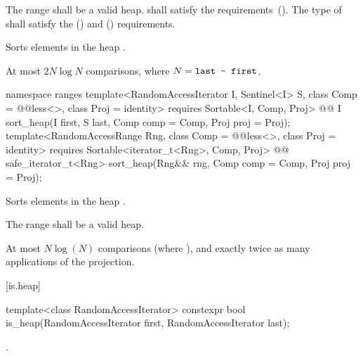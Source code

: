 \begin{itemdescr}
\pnum
\requires The range  shall be a valid heap.
 shall satisfy the
 requirements~(). The type
of  shall satisfy the
 () and
 () requirements.

\pnum
\effects
Sorts elements in the heap
.

\pnum
\complexity
At most $2N \log N$
comparisons, where
$N = \texttt{last - first}$.
\end{itemdescr}

\begin{addedblock}
%
\begin{itemdecl}
namespace ranges {
  template<RandomAccessIterator I, Sentinel<I> S, class Comp = @@less<>,
      class Proj = identity>
    requires Sortable<I, Comp, Proj>
    @@ I
      sort_heap(I first, S last, Comp comp = Comp{}, Proj proj = Proj{});
  template<RandomAccessRange Rng, class Comp = @@less<>, class Proj = identity>
    requires Sortable<iterator_t<Rng>, Comp, Proj>
    @@ safe_iterator_t<Rng>
      sort_heap(Rng&& rng, Comp comp = Comp{}, Proj proj = Proj{});
}
\end{itemdecl}

\begin{itemdescr}
\pnum
\effects
Sorts elements in the heap
.

\pnum
\requires The range  shall be a valid heap.

\pnum
\returns {}

\pnum
\complexity
At most $N \log(N)$
comparisons (where
), and exactly twice as many applications of the projection.
\end{itemdescr}
\end{addedblock}

[is.heap]{}

%
\begin{itemdecl}
template<class RandomAccessIterator>
  constexpr bool is_heap(RandomAccessIterator first, RandomAccessIterator last);
\end{itemdecl}

\begin{itemdescr}
\pnum
\returns {}.
\end{itemdescr}


